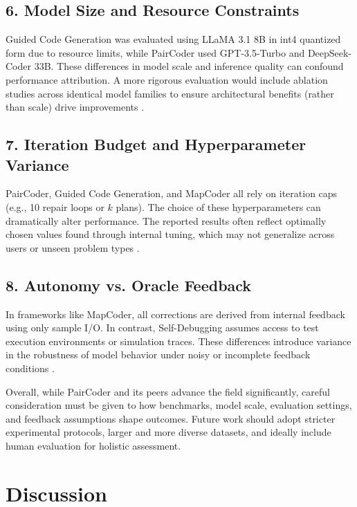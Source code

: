 \documentclass[11pt,a4paper]{article}
\begin{document}
\subsection*{6. Model Size and Resource Constraints}
Guided Code Generation was evaluated using LLaMA 3.1 8B in int4 quantized form due to resource limits, while PairCoder used GPT-3.5-Turbo and DeepSeek-Coder 33B. These differences in model scale and inference quality can confound performance attribution. A more rigorous evaluation would include ablation studies across identical model families to ensure architectural benefits (rather than scale) drive improvements \cite{zhang2024paircoder, almorsi2025guided}.

\subsection*{7. Iteration Budget and Hyperparameter Variance}
PairCoder, Guided Code Generation, and MapCoder all rely on iteration caps (e.g., 10 repair loops or $k$ plans). The choice of these hyperparameters can dramatically alter performance. The reported results often reflect optimally chosen values found through internal tuning, which may not generalize across users or unseen problem types \cite{zhang2024paircoder, islam2024mapcodermultiagentcodegeneration}.

\subsection*{8. Autonomy vs. Oracle Feedback}
In frameworks like MapCoder, all corrections are derived from internal feedback using only sample I/O. In contrast, Self-Debugging assumes access to test execution environments or simulation traces. These differences introduce variance in the robustness of model behavior under noisy or incomplete feedback conditions \cite{almorsi2025guided, islam2024mapcodermultiagentcodegeneration}.

Overall, while PairCoder and its peers advance the field significantly, careful consideration must be given to how benchmarks, model scale, evaluation settings, and feedback assumptions shape outcomes. Future work should adopt stricter experimental protocols, larger and more diverse datasets, and ideally include human evaluation for holistic assessment.










\section{Discussion}
\end{document}
